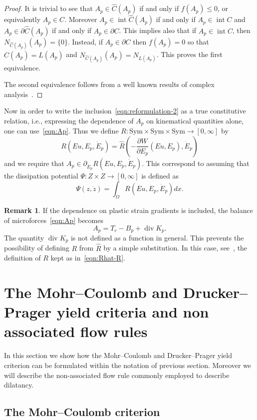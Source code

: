 \documentclass[a4paper,10pt,twoside]{amsbook}
\numberwithin{section}{chapter}
\numberwithin{equation}{chapter}
\theoremstyle{definition}
\newtheorem{rmk}[prop]{Remark}
\DeclareMathOperator{\inter}{int}
\DeclareMathOperator{\diver}{div}
\newcommand{\dind}[2]{\frac{\partial #1}{\partial #2}}
\begin{document}
\begin{proof}
It is trivial to see that $A_p\in\hat{C}(A_p)$ if and only if $f(A_p)\le 0$, or equivalently $A_p\in C$. Moreover $A_p\in\inter\hat{C}(A_p)$ if and only if $A_p\in\inter C$ and $A_p\in\partial\hat{C}(A_p)$ if and only if $A_p\in\partial C$. This implies also that if $A_p\in\inter C$, then $N_{\hat{C}(A_p)}(A_p)=\{0\}$. Instead, if $A_p\in\partial C$ then $f(A_p)=0$ so that $\hat{C}(A_p)=L(A_p)$ and $N_{\hat{C}(A_p)}(A_p)=N_{L(A_p)}$. This proves the first equivalence.

The second equivalence follows from a well known results of complex analysis~\cite[Corollary 5.2]{ekeland-temam}.
\end{proof}
Now in order to write the inclusion~\eqref{eqn:reformulation-2} as a true constitutive relation, i.e., expressing the dependence of $A_p$ on kinematical quantities alone, one can use~\eqref{eqn:Ap}. Thus we define $R\colon\text{Sym}\times\text{Sym}\times\text{Sym}\to[0,\infty]$ by
\begin{equation}
\label{eqn:Rhat-R}
R(Eu,E_p,\dot E_p)=\hat{R}\left(-\dind{W}{E_p}(Eu,E_p),\dot E_p\right)
\end{equation}
and we require that $A_p\in\partial_{\dot E_p}R(Eu,E_p,\dot E_p)$. This correspond to assuming that the dissipation potential $\Psi\colon Z\times Z\to[0,\infty]$ is defined as
\[
\Psi(z,\dot z)=\int_\Omega R(Eu,E_p,\dot E_p)dx.
\]
\begin{rmk}
If the dependence on plastic strain gradients is included, the balance of microforces~\eqref{eqn:Ap} becomes
\[
A_p=T_e-B_p+\diver K_p.
\]
The quantity $\diver K_p$ is not defined as a function in general. This prevents the possibility of defining $R$ from $\hat R$ by a simple substitution. In this case, see~\cite{StefanelliVikelis2024}, the definition of $R$ kept as in~\eqref{eqn:Rhat-R}.
\end{rmk}

\section{The Mohr--Coulomb and Drucker--Prager yield criteria and non associated flow rules}
\label{sec:yield-criteria}

In this section we show how the Mohr--Coulomb and Drucker--Prager yield criterion can be formulated within the notation of previous section. Moreover we will describe the non-associated flow rule commonly employed to describe dilatancy.

\subsection{The Mohr--Coulomb criterion}
\end{document}
